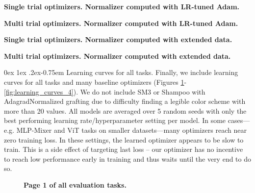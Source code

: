 \documentclass[11pt]{article}
\makeatletter
\renewcommand{\paragraph}{%
  \@startsection{paragraph}{4}%
  {\z@}{0ex \@plus 1ex \@minus .2ex}{-0.75em}%
  {\normalfont\normalsize\bfseries}%
}
\makeatother
\begin{document}
\begin{table}[h!]
    \centering
    \caption{\textbf{Single trial optimizers. Normalizer computed with LR-tuned Adam.}}
    
    \label{table:single_adam}
\end{table}

\begin{table}[h!]
    \centering
    \caption{\textbf{Multi trial optimizers. Normalizer computed with LR-tuned Adam.}}
    
    \label{table:multi_adam}
\end{table}

\begin{table}[h!]
    \centering
    \caption{\textbf{Single trial optimizers. Normalizer computed with extended data.}}
    
    \label{table:single_baseline}
\end{table}

\begin{table}[h!]
    \centering
    \caption{\textbf{Multi trial optimizers. Normalizer computed with extended data.}}
    
    \label{table:multi_baseline}
\end{table}



\paragraph{Learning curves for all tasks.}
Finally, we include learning curves for all tasks and many baseline optimizers (Figures \ref{fig:learning_curves_1}-\ref{fig:learning_curves_4}). We do not include SM3 or Shampoo with AdagradNormalized grafting due to difficulty finding a legible color scheme with more than 20 values.
All models are averaged over 5 random seeds with only the best performing learning rate/hyperparameter setting per model.
In some cases---e.g. MLP-Mixer and ViT tasks on smaller datasets---many optimizers reach near zero training loss. 
In these settings, the learned optimizer appears to be slow to train.
This is a side effect of targeting last loss -- our optimizer has no incentive to reach low performance early in training and thus waits until the very end to do so.

\begin{figure}[h!]
    \centering
    
    \caption{\textbf{Page 1 of all evaluation tasks.} \label{fig:learning_curves_1}
    }
\end{figure}
\end{document}
